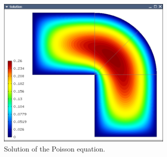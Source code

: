 \documentclass[11pt]{article}
\begin{document}
\begin{figure}[!ht]
  \centering\medskip
  \includegraphics[width=0.75\textwidth]{img/poisson.png}
  \caption{Solution of the Poisson equation.}
  \label{fig:poisson}
\end{figure}



%
%
%
%
%
%
%
%
%
\end{document}
